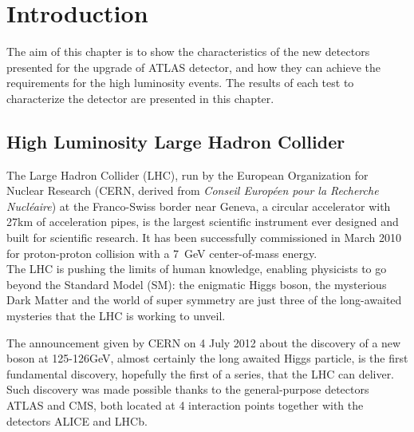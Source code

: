 \section{Introduction}
The aim of this chapter is to show the characteristics of the new detectors presented for the upgrade of ATLAS detector,
and how they can achieve the requirements for the high luminosity events.
The results of each test to characterize the detector are presented in this chapter.


\subsection{High Luminosity Large Hadron Collider}
The Large Hadron Collider (LHC), run by the European Organization for Nuclear Research (CERN, derived from {\it Conseil
Europ\'een pour la Recherche Nucl\'eaire}) at the Franco-Swiss border near Geneva, a circular accelerator with 27km of acceleration pipes, is the largest scientific instrument ever designed and built for scientific research.
It has been successfully commissioned in March 2010 for proton-proton collision with a \SI{7}{GeV} center-of-mass energy.\\ 
The LHC is pushing the limits of human knowledge, enabling physicists to go beyond the Standard Model (SM): the enigmatic
Higgs boson, the mysterious Dark Matter and the world of super symmetry are just three of the long-awaited mysteries that
the LHC is working to unveil. \par
The announcement given by CERN on 4 July 2012 about the discovery of a new boson at 125-126GeV\cite{atlas,cms}, almost certainly
the long awaited Higgs particle, is the first fundamental discovery, hopefully the first of a series, that the LHC can
deliver.\\ Such discovery was made possible thanks to the general-purpose detectors ATLAS and CMS, both located at 4
interaction points together with the detectors ALICE and LHCb.\par



